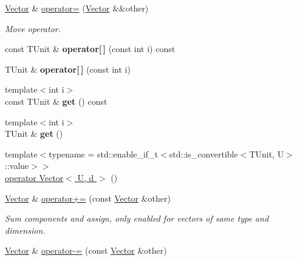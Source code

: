 \begin{DoxyCompactItemize}
\hypertarget{classVector_a29b1e46e39ad65fd01e11495ebcdb8b7}{}\label{classVector_a29b1e46e39ad65fd01e11495ebcdb8b7} 
\hyperlink{classVector}{Vector} \& \hyperlink{classVector_a29b1e46e39ad65fd01e11495ebcdb8b7}{operator=} (\hyperlink{classVector}{Vector} \&\&other)
\begin{DoxyCompactList}\small\item\em Move operator. \end{DoxyCompactList}\item 
\hypertarget{classVector_afb0121e977fc4410894899e4679346a8}{}\label{classVector_afb0121e977fc4410894899e4679346a8} 
const T\+Unit \& {\bfseries operator\mbox{[}$\,$\mbox{]}} (const int i) const
\item 
\hypertarget{classVector_a35b278e92de6cb917c8605bf2a8951e2}{}\label{classVector_a35b278e92de6cb917c8605bf2a8951e2} 
T\+Unit \& {\bfseries operator\mbox{[}$\,$\mbox{]}} (const int i)
\item 
\hypertarget{classVector_a7975d342c5f6ee6639f45f946c158d23}{}\label{classVector_a7975d342c5f6ee6639f45f946c158d23} 
{\footnotesize template$<$int i$>$ }\\const T\+Unit \& {\bfseries get} () const
\item 
\hypertarget{classVector_aa69485c9cfa648be36da33b3a27a5072}{}\label{classVector_aa69485c9cfa648be36da33b3a27a5072} 
{\footnotesize template$<$int i$>$ }\\T\+Unit \& {\bfseries get} ()
\item 
{\footnotesize template$<$typename  = std\+::enable\+\_\+if\+\_\+t$<$std\+::is\+\_\+convertible$<$\+T\+Unit, U$>$\+::value$>$$>$ }\\\hyperlink{classVector_af246ad31be841c0ff30906f2363bb415}{operator Vector$<$ U, d $>$} ()
\item 
\hypertarget{classVector_a6451ff990b9771e8e7e693f91720260d}{}\label{classVector_a6451ff990b9771e8e7e693f91720260d} 
\hyperlink{classVector}{Vector} \& \hyperlink{classVector_a6451ff990b9771e8e7e693f91720260d}{operator+=} (const \hyperlink{classVector}{Vector} \&other)
\begin{DoxyCompactList}\small\item\em Sum components and assign, only enabled for vectors of same type and dimension. \end{DoxyCompactList}\item 
\hypertarget{classVector_afb827fd80709361d40cb8e9b96d837ac}{}\label{classVector_afb827fd80709361d40cb8e9b96d837ac} 
\hyperlink{classVector}{Vector} \& \hyperlink{classVector_afb827fd80709361d40cb8e9b96d837ac}{operator-\/=} (const \hyperlink{classVector}{Vector} \&other)

\end{DoxyCompactItemize}
